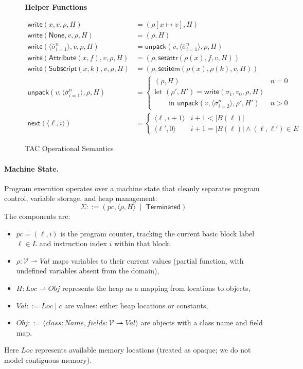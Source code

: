 \begin{figure*}[p]
\vspace{1ex}
\textbf{Helper Functions}

\[
\begin{aligned}
\mathsf{write}(x,v,\rho,H) &= (\rho[x \mapsto v],H) \\
\mathsf{write}(\mathsf{None},v,\rho,H) &= (\rho,H) \\
\mathsf{write}(\langle\overline{\sigma}_{i=1}^n\rangle,v,\rho,H)
    &= \mathsf{unpack}(v,\langle\overline{\sigma}_{i=1}^n\rangle,\rho,H) \\
\mathsf{write}(\mathsf{Attribute}(x,f),v,\rho,H)
    &= (\rho,\mathsf{setattr}(\rho(x),f,v,H)) \\
\mathsf{write}(\mathsf{Subscript}(x,k),v,\rho,H)
    &= (\rho,\mathsf{setitem}(\rho(x),\rho(k),v,H)) \\[1ex]
\mathsf{unpack}(v,\langle\overline{\sigma}_{i=1}^n\rangle,\rho,H) &=
\begin{cases}
(\rho,H) & n=0 \\
\text{let } (\rho',H')=\mathsf{write}(\sigma_1,v_0,\rho,H) \\
\qquad \text{in } \mathsf{unpack}(v,\langle\overline{\sigma}_{i=2}^n\rangle,\rho',H') & n>0
\end{cases} \\[2ex]
\mathsf{next}(\langle\ell,i\rangle) &=
\begin{cases}
\langle\ell,i+1\rangle & i+1<|B(\ell)| \\
\langle\ell',0\rangle & i+1=|B(\ell)| \land (\ell,\ell')\in E
\end{cases}
\end{aligned}
\]

\caption{TAC Operational Semantics}
\label{fig:tac-semantics}
\end{figure*}

\paragraph{Machine State.}
Program execution operates over a machine state that cleanly separates program control, variable storage, and heap management:
\[
\Sigma ::= ( pc, \langle \rho, H \rangle \;\mid\; \mathsf{Terminated} )
\]
The components are:
\begin{itemize}
\item $pc = (\ell,i)$ is the program counter, tracking the current basic block label $\ell \in L$ and instruction index $i$ within that block,
\item $\rho : \mathcal{V} \rightharpoonup Val$ maps variables to their current values (partial function, with undefined variables absent from the domain),
\item $H : Loc \rightharpoonup Obj$ represents the heap as a mapping from locations to objects,
\item $Val ::= Loc \mid c$ are values: either heap locations or constants,
\item $Obj ::= \langle class:Name, fields: \mathcal{V} \rightharpoonup Val \rangle$ are objects with a class name and field map.
\end{itemize}
Here $Loc$ represents available memory locations (treated as opaque; we do not model contiguous memory).


